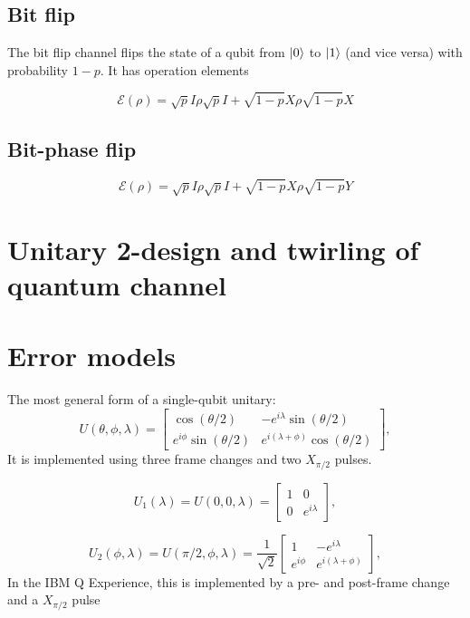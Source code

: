 \documentclass[11pt, oneside]{article}   	%
\begin{document}
\subsection{Bit flip}
The bit flip channel flips the state of a qubit from $\ket{0}$ to $\ket{1}$ (and vice versa) with probability $1-p$. 
It has operation elements

\begin{equation}
\mathcal{E} (\rho) = \sqrt{p} I \rho  \sqrt{p} I + \sqrt{1-p} X  \rho \sqrt{1-p} X 
\end{equation}

\subsection{Bit-phase flip}
\begin{equation}
\mathcal{E} (\rho) = \sqrt{p} I \rho  \sqrt{p} I + \sqrt{1-p} X  \rho \sqrt{1-p} Y
\end{equation}

\section{Unitary 2-design and twirling of quantum channel}
\section{Error models}
The most general form of a single-qubit unitary:
\begin{equation}
U (\theta, \phi, \lambda) = 
\begin{bmatrix}
\cos (\theta/2) & - e^{i \lambda} \sin (\theta/2) \\
e^{i \phi} \sin (\theta/2) & e^{i (\lambda + \phi)} \cos (\theta/2)
\end{bmatrix}, 
\end{equation}
It is implemented using three frame changes and two $X_{\pi/2}$ pulses. 

\begin{equation}
U_1(\lambda) = U (0, 0, \lambda) = 
\begin{bmatrix}
1 & 0 \\
0 & e^{i \lambda}
\end{bmatrix}, 
\end{equation}

\begin{equation}
U_2 (\phi, \lambda) = U (\pi/2, \phi, \lambda) = \frac{1}{\sqrt{2}}
\begin{bmatrix}
1 & - e^{i \lambda} \\
e^{i \phi} & e^{i (\lambda + \phi)}
\end{bmatrix}, 
\end{equation}
 In the IBM Q Experience, this is implemented by a pre- and post-frame change and a $X_{\pi/2}$ pulse
\end{document}
